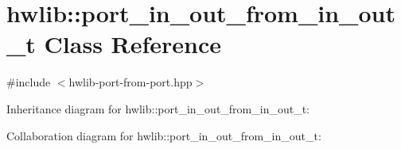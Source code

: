 \hypertarget{classhwlib_1_1port__in__out__from__in__out__t}{}\section{hwlib\+:\+:port\+\_\+in\+\_\+out\+\_\+from\+\_\+in\+\_\+out\+\_\+t Class Reference}
\label{classhwlib_1_1port__in__out__from__in__out__t}


{\ttfamily \#include $<$hwlib-\/port-\/from-\/port.\+hpp$>$}



Inheritance diagram for hwlib\+:\+:port\+\_\+in\+\_\+out\+\_\+from\+\_\+in\+\_\+out\+\_\+t\+:


Collaboration diagram for hwlib\+:\+:port\+\_\+in\+\_\+out\+\_\+from\+\_\+in\+\_\+out\+\_\+t\+:
